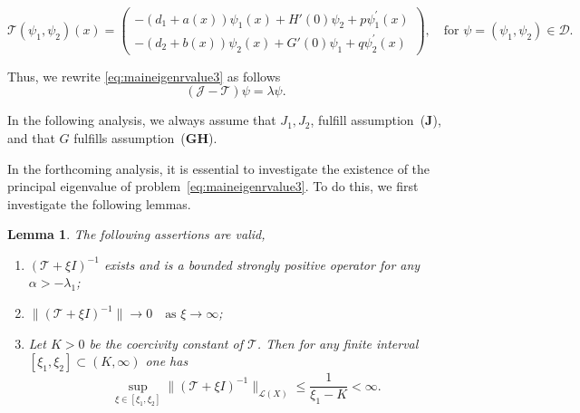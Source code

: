 \documentclass[a4paper,11pt]{amsart}
\newtheorem{lemma}[theorem]{Lemma}
\theoremstyle{definition}
\numberwithin{equation}{section}
\theoremstyle{definition}
\begin{document}
\[
\mathscr{T}(\psi_{1}, \psi_{2})(x) =
\begin{pmatrix}
 -\left(d_1  + a(x)\right) \psi_1(x) +H'(0) \psi_2
+ p \psi_1^\prime(x) \\[1.2em]
- \left(d_2  + b(x)\right) \psi_2(x) +G'(0) \psi_1
+ q \psi_2^\prime(x)
\end{pmatrix},
\quad \text{for } \psi = (\psi_{1}, \psi_{2}) \in \mathcal{D}.
\]

Thus, we rewrite \eqref{eq:maineigenrvalue3} as follows
\[
(\mathscr{J} - \mathscr{T})\psi = \lambda \psi.
\]

In the following analysis, we always assume that $J_{1}, J_{2}$,  fulfill assumption~($\mathbf{J}$), and that $G$ fulfills assumption~($\mathbf{GH}$).

In the forthcoming analysis, it is essential to investigate the existence of the principal eigenvalue of problem~\eqref{eq:maineigenrvalue3}. To do this, we first investigate the following lemmas.

\begin{lemma}\label{lem:3.1}
The following assertions are valid,
\begin{enumerate}
    \item $(\mathscr{T} + \xi I)^{-1}$ exists and is a bounded strongly positive operator for any $\alpha > -\lambda_{1}$;
    \item $\|(\mathscr{T} + \xi I)^{-1}\| \to 0 \quad \text{as } \xi \to \infty$;
    \item  Let $K>0$ be the coercivity constant of $\mathscr{T}$.
Then for any finite interval $[\xi_{1}, \xi_{2}] \subset (K,\infty)$ one has
\[
\sup_{\xi \in [\xi_{1}, \xi_{2}]} \|(\mathscr{T} + \xi I)^{-1}\|_{\mathcal{L}(X)}
   \le \frac{1}{\xi_{1}-K} < \infty.
\]
\end{enumerate}
\end{lemma}
\end{document}
